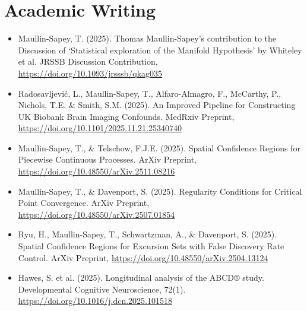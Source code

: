 \documentclass{friggeri-cv}
\begin{document}
\section{Academic Writing}
\footnotesize{
\begin{itemize}

    \item Maullin-Sapey, T. (2025). Thomas Maullin-Sapey’s contribution to the Discussion of ‘Statistical exploration of the Manifold Hypothesis’ by Whiteley et al. JRSSB Discussion Contribution, \url{https://doi.org/10.1093/jrsssb/qkag035}

    \item Radosavljevi\'c, L., Maullin-Sapey, T., Alfaro-Almagro, F., McCarthy, P., Nichols, T.E. \& Smith, S.M. (2025). An Improved Pipeline for Constructing UK Biobank Brain Imaging Confounds. MedRxiv Preprint, \url{https://doi.org/10.1101/2025.11.21.25340740}
    
    \item Maullin-Sapey, T., \& Telschow, F.J.E. (2025). Spatial Confidence Regions for Piecewise Continuous Processes. ArXiv Preprint, \url{https://doi.org/10.48550/arXiv.2511.08216}
    
    \item Maullin-Sapey, T., \& Davenport, S. (2025). Regularity Conditions for Critical Point Convergence. ArXiv Preprint, \url{https://doi.org/10.48550/arXiv.2507.01854}

    \item Ryu, H., Maullin-Sapey, T., Schwartzman, A., \& Davenport, S. (2025). Spatial Confidence Regions for Excursion Sets with False Discovery Rate Control. ArXiv Preprint, \url{https://doi.org/10.48550/arXiv.2504.13124}

    \item Hawes, S. et al. (2025). Longitudinal analysis of the ABCD® study. Developmental Cognitive Neuroscience, 72(1). \url{https://doi.org/10.1016/j.dcn.2025.101518}




\end{itemize}}
\end{document}
